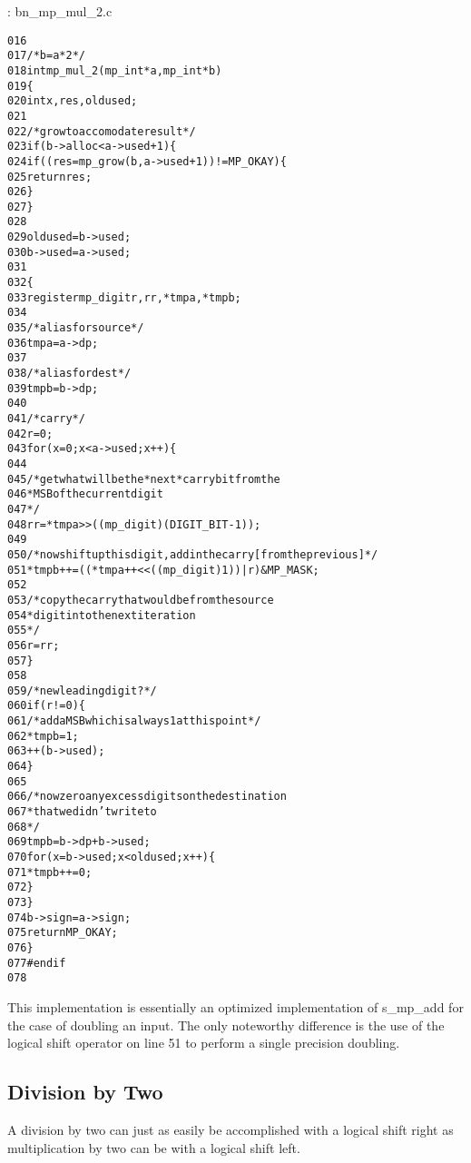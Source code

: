 \documentclass[b5paper]{book}
\begin{document}
\vspace{+3mm}\begin{small}
\hspace{-5.1mm}{\bf File}: bn\_mp\_mul\_2.c
\vspace{-3mm}
\begin{alltt}
016   
017   /* b = a*2 */
018   int mp_mul_2(mp_int * a, mp_int * b)
019   \{
020     int     x, res, oldused;
021   
022     /* grow to accomodate result */
023     if (b->alloc < a->used + 1) \{
024       if ((res = mp_grow (b, a->used + 1)) != MP_OKAY) \{
025         return res;
026       \}
027     \}
028   
029     oldused = b->used;
030     b->used = a->used;
031   
032     \{
033       register mp_digit r, rr, *tmpa, *tmpb;
034   
035       /* alias for source */
036       tmpa = a->dp;
037       
038       /* alias for dest */
039       tmpb = b->dp;
040   
041       /* carry */
042       r = 0;
043       for (x = 0; x < a->used; x++) \{
044       
045         /* get what will be the *next* carry bit from the 
046          * MSB of the current digit 
047          */
048         rr = *tmpa >> ((mp_digit)(DIGIT_BIT - 1));
049         
050         /* now shift up this digit, add in the carry [from the previous] */
051         *tmpb++ = ((*tmpa++ << ((mp_digit)1)) | r) & MP_MASK;
052         
053         /* copy the carry that would be from the source 
054          * digit into the next iteration 
055          */
056         r = rr;
057       \}
058   
059       /* new leading digit? */
060       if (r != 0) \{
061         /* add a MSB which is always 1 at this point */
062         *tmpb = 1;
063         ++(b->used);
064       \}
065   
066       /* now zero any excess digits on the destination 
067        * that we didn't write to 
068        */
069       tmpb = b->dp + b->used;
070       for (x = b->used; x < oldused; x++) \{
071         *tmpb++ = 0;
072       \}
073     \}
074     b->sign = a->sign;
075     return MP_OKAY;
076   \}
077   #endif
078   
\end{alltt}
\end{small}

This implementation is essentially an optimized implementation of s\_mp\_add for the case of doubling an input.  The only noteworthy difference
is the use of the logical shift operator on line 51 to perform a single precision doubling.  

\subsection{Division by Two}
A division by two can just as easily be accomplished with a logical shift right as multiplication by two can be with a logical shift left.
\end{document}
